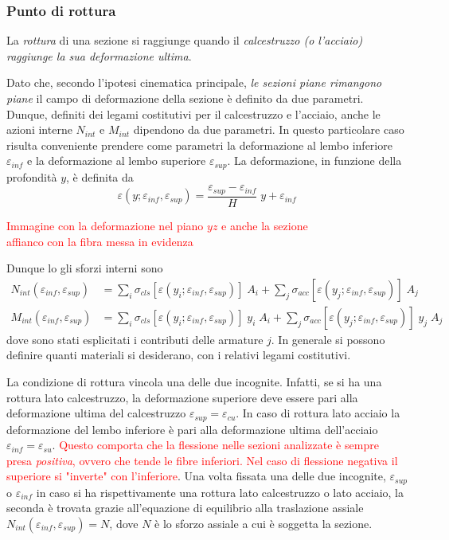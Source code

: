 \documentclass[10pt]{article}
\begin{document}
\subsubsection{Punto di rottura}

La \emph{rottura} di una sezione si raggiunge quando il \textit{calcestruzzo (o l'acciaio) raggiunge la sua deformazione ultima}.

Dato che, secondo l'ipotesi cinematica principale, \textit{le sezioni piane rimangono piane} il campo di deformazione della sezione è definito da due parametri. Dunque, definiti dei legami costitutivi per il calcestruzzo e l'acciaio, anche le azioni interne $N_{int}$ e $M_{int}$ dipendono da due parametri. In questo particolare caso risulta conveniente prendere come parametri la deformazione al lembo inferiore $\varepsilon_{inf}$ e la deformazione al lembo superiore $\varepsilon_{sup}$. La deformazione, in funzione della profondità $y$, è definita da
\begin{equation}
\varepsilon(y;\varepsilon_{inf},\varepsilon_{sup}) = \frac{\varepsilon_{sup}-\varepsilon_{inf}}{H} \; y + \varepsilon_{inf}
\end{equation}

\begin{center}
\textcolor{red}{Immagine con la deformazione nel piano $yz$ e anche la sezione\\ affianco con la fibra messa in evidenza}
\end{center}

Dunque lo gli sforzi interni sono
\begin{align}
N_{int}(\varepsilon_{inf},\varepsilon_{sup}) & = \sum_i \sigma_{cls}[\varepsilon(y_i;\varepsilon_{inf},\varepsilon_{sup})] \; A_i + \sum_j \sigma_{acc}[\varepsilon(y_j;\varepsilon_{inf},\varepsilon_{sup})] \; A_j \\
M_{int}(\varepsilon_{inf},\varepsilon_{sup}) & = \sum_i \sigma_{cls}[\varepsilon(y_i;\varepsilon_{inf},\varepsilon_{sup})] \; y_i \; A_i + \sum_j \sigma_{acc}[\varepsilon(y_j;\varepsilon_{inf},\varepsilon_{sup})] \; y_j \; A_j
\end{align}
dove sono stati esplicitati i contributi delle armature $j$. In generale si possono definire quanti materiali si desiderano, con i relativi legami costitutivi.

La condizione di rottura vincola una delle due incognite. Infatti, se si ha una rottura lato calcestruzzo, la deformazione superiore deve essere pari alla deformazione ultima del calcestruzzo $\varepsilon_{sup} = \varepsilon_{cu}$. In caso di rottura lato acciaio la deformazione del lembo inferiore è pari alla deformazione ultima dell'acciaio $\varepsilon_{inf} = \varepsilon_{su}$. \textcolor{red}{Questo comporta che la flessione nelle sezioni analizzate è sempre presa \textit{positiva}, ovvero che tende le fibre inferiori. Nel caso di flessione negativa il superiore si "inverte" con l'inferiore}.
Una volta fissata una delle due incognite, $\varepsilon_{sup}$ o $\varepsilon_{inf}$ in caso si ha rispettivamente una rottura lato calcestruzzo o lato acciaio, la seconda è trovata grazie all'equazione di equilibrio alla traslazione assiale $N_{int}(\varepsilon_{inf},\varepsilon_{sup}) = N$, dove $N$ è lo sforzo assiale a cui è soggetta la sezione.
\end{document}
